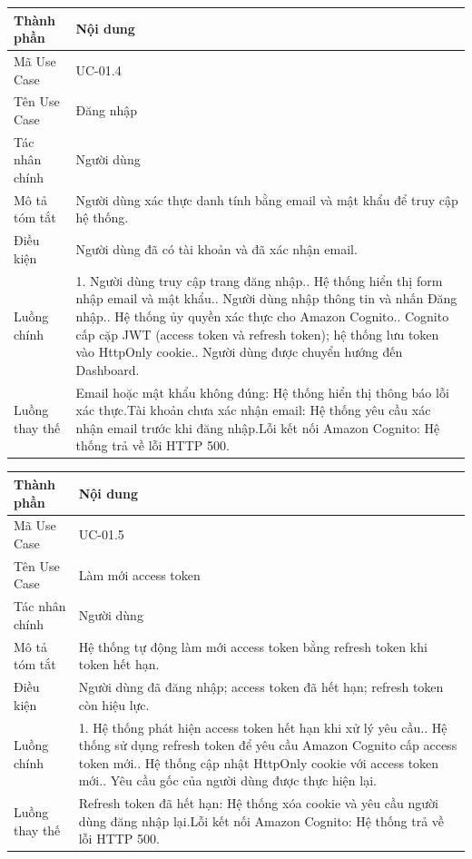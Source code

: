 \vspace{0.5cm}
\noindent\begin{tabular}{|p{3.5cm}|p{10.5cm}|}
\hline
\textbf{Thành phần} & \textbf{Nội dung} \\
\hline
Mã Use Case & UC-01.4 \\
\hline
Tên Use Case & Đăng nhập \\
\hline
Tác nhân chính & Người dùng \\
\hline
Mô tả tóm tắt & Người dùng xác thực danh tính bằng email và mật khẩu để truy cập hệ thống. \\
\hline
Điều kiện & Người dùng đã có tài khoản và đã xác nhận email. \\
\hline
Luồng chính & 1. Người dùng truy cập trang đăng nhập.\newline 2. Hệ thống hiển thị form nhập email và mật khẩu.\newline 3. Người dùng nhập thông tin và nhấn Đăng nhập.\newline 4. Hệ thống ủy quyền xác thực cho Amazon Cognito.\newline 5. Cognito cấp cặp JWT (access token và refresh token); hệ thống lưu token vào HttpOnly cookie.\newline 6. Người dùng được chuyển hướng đến Dashboard. \\
\hline
Luồng thay thế & Email hoặc mật khẩu không đúng: Hệ thống hiển thị thông báo lỗi xác thực.\newline Tài khoản chưa xác nhận email: Hệ thống yêu cầu xác nhận email trước khi đăng nhập.\newline Lỗi kết nối Amazon Cognito: Hệ thống trả về lỗi HTTP 500. \\
\hline
\end{tabular}

\vspace{0.5cm}
\noindent\begin{tabular}{|p{3.5cm}|p{10.5cm}|}
\hline
\textbf{Thành phần} & \textbf{Nội dung} \\
\hline
Mã Use Case & UC-01.5 \\
\hline
Tên Use Case & Làm mới access token \\
\hline
Tác nhân chính & Người dùng \\
\hline
Mô tả tóm tắt & Hệ thống tự động làm mới access token bằng refresh token khi token hết hạn. \\
\hline
Điều kiện & Người dùng đã đăng nhập; access token đã hết hạn; refresh token còn hiệu lực. \\
\hline
Luồng chính & 1. Hệ thống phát hiện access token hết hạn khi xử lý yêu cầu.\newline 2. Hệ thống sử dụng refresh token để yêu cầu Amazon Cognito cấp access token mới.\newline 3. Hệ thống cập nhật HttpOnly cookie với access token mới.\newline 4. Yêu cầu gốc của người dùng được thực hiện lại. \\
\hline
Luồng thay thế & Refresh token đã hết hạn: Hệ thống xóa cookie và yêu cầu người dùng đăng nhập lại.\newline Lỗi kết nối Amazon Cognito: Hệ thống trả về lỗi HTTP 500. \\
\hline
\end{tabular}

